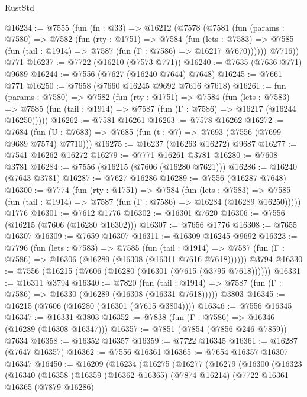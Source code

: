 \begin{lexlean}{RustStd}
\begin{coremodule}
{\begin{coremodule}
{{{{{{{{{{{{{{{{{{{{{{{{{{{{{{{{{{{{{{{{{{{@16234 := @7555
    (fun (fn : @33) =>
    @16212
      (@7578
        (@7581
          (fun (params : @7580) =>
          @7582
            (fun (rty : @1751) =>
            @7584
              (fun (lets : @7583) =>
              @7585 (fun (tail : @1914) => @7587 (fun (Γ : @7586) => @16217 @7670))))))
        @7716))
    @771
@16237 := @7722 (@16210 (@7573 @771))
@16240 := @7635 (@7636 @771) @9689
@16244 := @7556 (@7627 (@16240 @7644) @7648)
@16245 := @7661 @771
@16250 := @7658 (@7660 @16245 @9692 @7616 @7618)
@16261 := fun (params : @7580) =>
  @7582
    (fun (rty : @1751) =>
    @7584
      (fun (lets : @7583) =>
      @7585 (fun (tail : @1914) => @7587 (fun (Γ : @7586) => @16217 (@16244 @16250)))))
@16262 := @7581 @16261
@16263 := @7578 @16262
@16272 := @7684 (fun (U : @7683) => @7685 (fun (t : @7) => @7693 (@7556 (@7699 @9689 @7574) @7710)))
@16275 := @16237 (@16263 @16272) @9687
@16277 := @7541 @16262 @16272
@16279 := @7771 @16261 @3781
@16280 := @7608 @3781
@16284 := @7556 (@16215 (@7606 (@16280 @7621)))
@16286 := @16240 (@7643 @3781)
@16287 := @7627 @16286
@16289 := @7556 (@16287 @7648)
@16300 := @7774
    (fun (rty : @1751) =>
    @7584
      (fun (lets : @7583) =>
      @7585 (fun (tail : @1914) => @7587 (fun (Γ : @7586) => @16284 (@16289 @16250)))))
    @1776
@16301 := @7612 @1776
@16302 := @16301 @7620
@16306 := @7556 (@16215 (@7606 (@16280 @16302)))
@16307 := @7656 @1776
@16308 := @7655 @16307
@16309 := @7659 @16307
@16311 := @16309 @16245 @9692
@16323 := @7796
    (fun (lets : @7583) =>
    @7585
      (fun (tail : @1914) =>
      @7587 (fun (Γ : @7586) => @16306 (@16289 (@16308 (@16311 @7616 @7618))))))
    @3794
@16330 := @7556 (@16215 (@7606 (@16280 (@16301 (@7615 (@3795 @7618))))))
@16331 := @16311 @3794
@16340 := @7820
    (fun (tail : @1914) => @7587 (fun (Γ : @7586) => @16330 (@16289 (@16308 (@16331 @7618)))))
    @3803
@16345 := @16215 (@7606 (@16280 (@16301 (@7615 @3804))))
@16346 := @7556 @16345
@16347 := @16331 @3803
@16352 := @7838 (fun (Γ : @7586) => @16346 (@16289 (@16308 @16347)))
@16357 := @7851 (@7854 (@7856 @246 @7859)) @7634
@16358 := @16352 @16357
@16359 := @7722 @16345
@16361 := @16287 (@7647 @16357)
@16362 := @7556 @16361
@16365 := @7654 @16357 @16307 @16347
@16450 := @16209
    (@16234
      (@16275
        (@16277
          (@16279
            (@16300
              (@16323
                (@16340
                  (@16358
                    (@16359
                      (@16362 @16365)
                      (@7874 @16214)
                      (@7722
                        @16361
                        @16365
                        (@7879 @16286)
}}}}}}}}}}}}}}}}}}}}}}}}}}}}}}}}}}}}}}}}}}}
\end{coremodule}}
\end{coremodule}
\end{lexlean}
